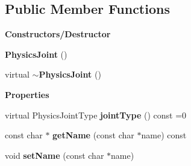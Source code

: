 \subsection*{Public Member Functions}
\begin{Indent}\textbf{ Constructors/\+Destructor}\par
\begin{DoxyCompactItemize}
\item 
\mbox{\label{classrev_1_1_physics_joint_af398261619214f6db346f231c4424413}} 
{\bfseries Physics\+Joint} ()
\item 
\mbox{\label{classrev_1_1_physics_joint_aec55e9f372f27ecebe843a8f6ee00017}} 
virtual {\bfseries $\sim$\+Physics\+Joint} ()
\end{DoxyCompactItemize}
\end{Indent}
\begin{Indent}\textbf{ Properties}\par
\begin{DoxyCompactItemize}
\item 
\mbox{\label{classrev_1_1_physics_joint_af362c194fe89cbc2678c6fe4ef4b848a}} 
virtual Physics\+Joint\+Type {\bfseries joint\+Type} () const =0
\item 
\mbox{\label{classrev_1_1_physics_joint_a215e227d6a0b8ee23cb0a89446e952b4}} 
const char $\ast$ {\bfseries get\+Name} (const char $\ast$name) const
\item 
\mbox{\label{classrev_1_1_physics_joint_a2ddaebd6aee2bf2329c09bd6cb05b993}} 
void {\bfseries set\+Name} (const char $\ast$name)
\end{DoxyCompactItemize}
\end{Indent}
